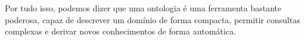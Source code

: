 Por tudo isso, podemos dizer que uma ontologia é uma ferramenta bastante poderosa, capaz de descrever um domínio de forma compacta, permitir consultas complexas e derivar novos conhecimentos de forma automática.


